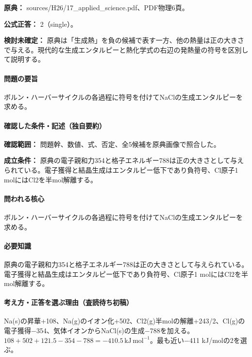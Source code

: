 \noindent\textbf{原典：} sources/H26/17\_applied\_science.pdf、PDF物理6頁。

\textbf{公式正答：} 2（single）。

\par\textbf{検討未確定：} 原典は「生成熱」を負の候補で表す一方、他の熱量は正の大きさで与える。現代的な生成エンタルピーと熱化学式の右辺の発熱量の符号を区別して説明する。

\paragraph{問題の要旨} ボルン・ハーバーサイクルの各過程に符号を付けてNaClの生成エンタルピーを求める。

\paragraph{確認した条件・記述（独自要約）}\mbox{}\par

\noindent\textbf{確認範囲：} 問題幹、数値、式、否定、全5候補を原典画像で照合した。\par

\noindent\textbf{成立条件：} 原典の電子親和力354と格子エネルギー788は正の大きさとして与えられている。電子獲得と結晶生成はエンタルピー低下であり負符号、Cl原子1 molにはCl2を半mol解離する。\par

\paragraph{問われる核心} ボルン・ハーバーサイクルの各過程に符号を付けてNaClの生成エンタルピーを求める。

\paragraph{必要知識} 原典の電子親和力354と格子エネルギー788は正の大きさとして与えられている。電子獲得と結晶生成はエンタルピー低下であり負符号、Cl原子1 molにはCl2を半mol解離する。

\paragraph{考え方・正答を選ぶ理由（査読待ち初稿）} Na(s)の昇華+108、Na(g)のイオン化+502、Cl2(g)半molの解離+243/2、Cl(g)の電子獲得−354、気体イオンからNaCl(s)の生成−788を加える。\(108+502+121.5-354-788=-410.5\,\mathrm{kJ\,mol^{-1}}\)。最も近い−411 kJ/molの2を選ぶ。

